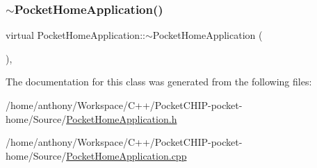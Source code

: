 \mbox{\label{classPocketHomeApplication_afc564af8e987cd7f9f71ac9e446d6da3}} 
\subsubsection{\texorpdfstring{$\sim$\+Pocket\+Home\+Application()}{~PocketHomeApplication()}}
{\footnotesize\ttfamily virtual Pocket\+Home\+Application\+::$\sim$\+Pocket\+Home\+Application (\begin{DoxyParamCaption}{ }\end{DoxyParamCaption})\hspace{0.3cm}{\ttfamily [inline]}, {\ttfamily [virtual]}}



The documentation for this class was generated from the following files\+:\begin{DoxyCompactItemize}
\item 
/home/anthony/\+Workspace/\+C++/\+Pocket\+C\+H\+I\+P-\/pocket-\/home/\+Source/\mbox{\hyperlink{PocketHomeApplication_8h}{Pocket\+Home\+Application.\+h}}\item 
/home/anthony/\+Workspace/\+C++/\+Pocket\+C\+H\+I\+P-\/pocket-\/home/\+Source/\mbox{\hyperlink{PocketHomeApplication_8cpp}{Pocket\+Home\+Application.\+cpp}}\end{DoxyCompactItemize}
